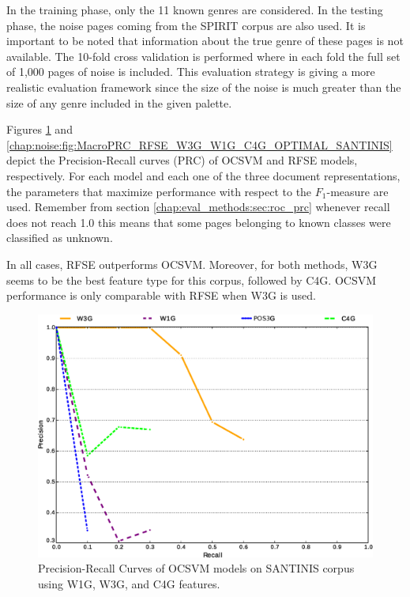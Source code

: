 In the training phase, only the 11 known genres are considered. In the testing phase, the noise pages coming from the SPIRIT corpus are also used. It is important to be noted that information about the true genre of these pages is not available. The 10-fold cross validation is performed where in each fold the full set of 1,000 pages of noise is included. This evaluation strategy is giving a more realistic evaluation framework since the size of the noise is much greater than the size of any genre included in the given palette.

Figures \ref{chap:noise:fig:MacroPRC_OCSVME_W3G_W1G_C4G_OPTIMAL_SANTINIS} and \ref{chap:noise:fig:MacroPRC_RFSE_W3G_W1G_C4G_OPTIMAL_SANTINIS} depict the Precision-Recall curves (PRC) of OCSVM and RFSE models, respectively. For each model and each one of the three document representations, the parameters that maximize performance with respect to the $F_{1}$-measure are used. Remember from section \ref{chap:eval_methods:sec:roc_prc} whenever recall does not reach 1.0 this means that some pages belonging to known classes were classified as unknown. 

In all cases, RFSE outperforms OCSVM. Moreover, for both methods, W3G seems to be the best feature type for this corpus, followed by C4G. OCSVM performance is only comparable with RFSE when W3G is used.

\hfill \break


\begin{figure}[t]
	\begin{center}
    \includegraphics[scale=0.45]{Figures/OCSME_Best_per_DocRep.eps}
	\caption{Precision-Recall Curves of OCSVM models on SANTINIS corpus using W1G, W3G, and C4G features.}
	\label{chap:noise:fig:MacroPRC_OCSVME_W3G_W1G_C4G_OPTIMAL_SANTINIS}
	\end{center}
\end{figure}

